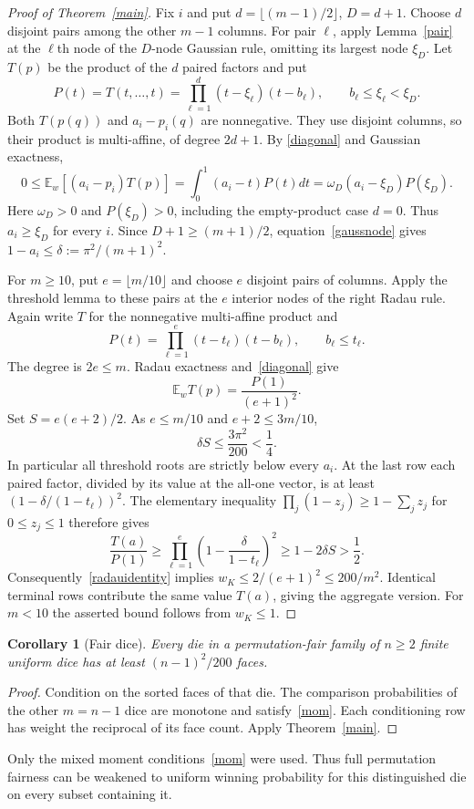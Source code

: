 \documentclass[11pt]{article}
\newtheorem{corollary}{Corollary}
\begin{document}
\begin{proof}[Proof of Theorem~\ref{main}]
Fix $i$ and put $d=\lfloor(m-1)/2\rfloor$, $D=d+1$.
Choose $d$ disjoint pairs among the other $m-1$ columns. For pair
$\ell$, apply Lemma~\ref{pair} at the $\ell$th node of the
$D$-node Gaussian rule, omitting its largest node $\xi_D$.
Let $T(p)$ be the product of the $d$ paired factors and put
\[
 P(t)=T(t,\ldots,t)=\prod_{\ell=1}^d(t-\xi_\ell)(t-b_\ell),
 \qquad b_\ell\le\xi_\ell<\xi_D.
\]
Both $T(p(q))$ and $a_i-p_i(q)$ are nonnegative. They use disjoint
columns, so their product is multi-affine, of degree $2d+1$. By
\eqref{diagonal} and Gaussian exactness,
\[
 0\le\mathbb E_w[(a_i-p_i)T(p)]
 =\int_0^1(a_i-t)P(t)dt
 =\omega_D(a_i-\xi_D)P(\xi_D).
\]
Here $\omega_D>0$ and $P(\xi_D)>0$, including the empty-product
case $d=0$. Thus $a_i\ge\xi_D$ for every $i$. Since
$D+1\ge(m+1)/2$, equation~\eqref{gaussnode} gives
$1-a_i\le\delta:=\pi^2/(m+1)^2$.

For $m\ge10$, put $e=\lfloor m/10\rfloor$ and choose $e$ disjoint
pairs of columns. Apply the threshold lemma to these pairs at the
$e$ interior nodes of the right Radau rule. Again write $T$ for the
nonnegative multi-affine product and
\[
 P(t)=\prod_{\ell=1}^e(t-t_\ell)(t-b_\ell),\qquad b_\ell\le t_\ell.
\]
The degree is $2e\le m$. Radau exactness and~\eqref{diagonal} give
\begin{equation}\label{radauidentity}
 \mathbb E_w T(p)=\frac{P(1)}{(e+1)^2}.
\end{equation}
Set $S=e(e+2)/2$. As $e\le m/10$ and $e+2\le3m/10$,
\[
 \delta S\le\frac{3\pi^2}{200}<\frac14.
\]
In particular all threshold roots are strictly below every $a_i$.
At the last row each paired factor, divided by its value at the
all-one vector, is at least
$(1-\delta/(1-t_\ell))^2$. The elementary inequality
$\prod_j(1-z_j)\ge1-\sum_jz_j$ for $0\le z_j\le1$ therefore gives
\[
 \frac{T(a)}{P(1)}
 \ge\prod_{\ell=1}^e
       \left(1-\frac{\delta}{1-t_\ell}\right)^2
 \ge1-2\delta S>\frac12.
\]
Consequently~\eqref{radauidentity} implies
$w_K\le2/(e+1)^2\le200/m^2$. Identical terminal rows contribute
the same value $T(a)$, giving the aggregate version. For $m<10$ the
asserted bound follows from $w_K\le1$.
\end{proof}

\begin{corollary}[Fair dice]
Every die in a permutation-fair family of $n\ge2$ finite uniform dice
has at least $(n-1)^2/200$ faces.
\end{corollary}
\begin{proof}
Condition on the sorted faces of that die. The comparison probabilities
of the other $m=n-1$ dice are monotone and satisfy~\eqref{mom}.
Each conditioning row has weight the reciprocal of its face count.
Apply Theorem~\ref{main}.
\end{proof}
Only the mixed moment conditions~\eqref{mom} were used. Thus full
permutation fairness can be weakened to uniform winning probability
for this distinguished die on every subset containing it.
\end{document}
